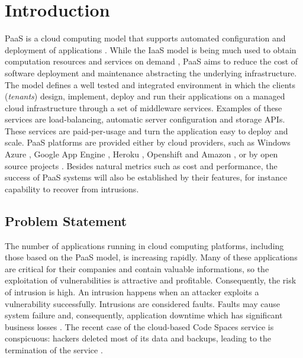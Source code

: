 \chapter{Introduction}\label{chapter:introduction}
\ac{PaaS} is a cloud computing model that supports automated configuration and deployment of applications \cite{Vaquero2008,Vaquero2011,Armbrust,Mell}. While the \ac{IaaS} model is being much used to obtain computation resources and services on demand \cite{Lenk2009,Armbrust2009}, \ac{PaaS} aims to reduce the cost of software deployment and maintenance abstracting the underlying infrastructure. The model defines a well tested and integrated environment in which the clients (\textit{tenants}) design, implement, deploy and run their applications on a managed cloud infrastructure through a set of middleware services. Examples of these services are load-balancing, automatic server configuration and storage \ac{API}s. These services are paid-per-usage and turn the application easy to deploy and scale.
\ac{PaaS} platforms are provided either by cloud providers, such as Windows Azure \cite{azure}, Google App Engine \cite{GoogleAppEngine}, Heroku \cite{Heroku}, Openshift \cite{OpenShift} and Amazon \cite{AmazonElasticBeanstalk}, or by open source projects \cite{Appscale,Cloudfoundry,ApacheStratos}. Besides natural metrics such as cost and performance, the success of \ac{PaaS} systems will also be established by their features, for instance capability to recover from intrusions.


\section{Problem Statement}\label{sec:introduction:problem}
The number of applications running in cloud computing platforms, including those based on the \ac{PaaS} model, is increasing rapidly. 
Many of these applications are critical for their companies and contain valuable informations, so the exploitation of vulnerabilities is attractive and profitable. Consequently, the risk of intrusion is high. An intrusion happens when an attacker exploits a vulnerability successfully. Intrusions are considered faults. Faults may cause system failure and, consequently, application downtime which has significant business losses \cite{Patterson2002a}. The recent case of the cloud-based Code Spaces service is conspicuous: hackers deleted most of its data and backups, leading to the termination of the service \cite{McAllister:14}. 

